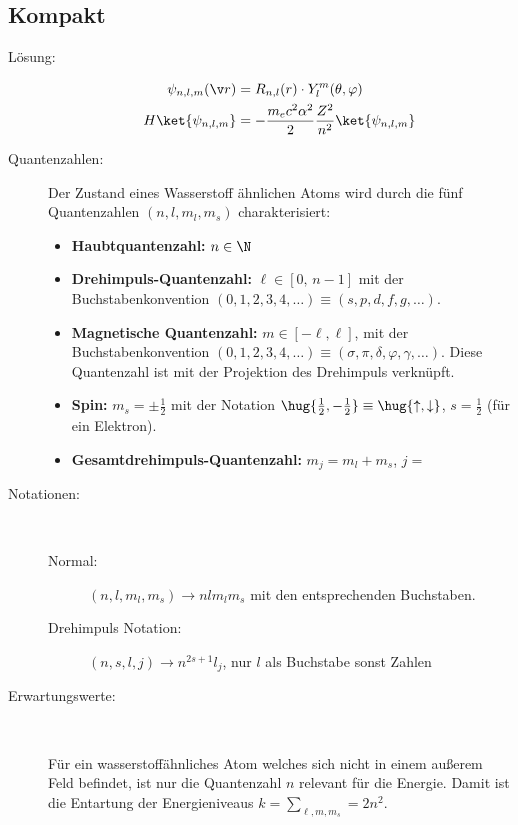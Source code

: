 \documentclass[twocolumn]{summery_4.1}
\begin{document}
\subsection{Kompakt} 
\begin{description}
    \item[Lösung:]
    \begin{align*}
        \psi_{n,l,m}(\v r) &= R_{n,l}(r)\cdot Y_l^m(\theta,\varphi)\\
        H \ket {\psi_{n,l,m}} &= -\frac{m_e c^2 \alpha^2}{2}\frac{Z^2}{n^2}\ket{\psi_{n,l,m}}
    \end{align*}
    \item[Quantenzahlen:]
    Der Zustand eines Wasserstoff ähnlichen Atoms wird durch die fünf Quantenzahlen $(n,l,m_l,m_s)$ charakterisiert:
    \begin{itemize}
        \item {\bf Haubtquantenzahl:} \(
            n\in\N\)
        \item {\bf Drehimpuls-Quantenzahl:} \(\ell\in[0,\,n-1]\)
        mit der Buchstabenkonvention \((0,1,2,3,4,\dots)\equiv (s,p,d,f,g,\dots)\). 
        \item {\bf Magnetische Quantenzahl:} \(m\in[-\ell,\ell]\), mit der Buchstabenkonvention
        \((0,1,2,3,4,\dots)\equiv (\sigma, \pi, \delta, \varphi, \gamma,\dots )\).
        Diese Quantenzahl ist mit der Projektion des Drehimpuls verknüpft.
        \item {\bf Spin:} \(m_s = \pm \frac12\) mit der Notation \(\hug{\frac12, -\frac12}\equiv \hug{\uparrow, \downarrow}\), \(s = \frac12\) (für ein Elektron). 
        \item {\bf Gesamtdrehimpuls-Quantenzahl:} \(m_j = m_l + m_s\), \(j=\)
    \end{itemize} 

    \item[Notationen:]\,
    
        \begin{description}
            \item[{\normalfont Normal:}] \((n,l,m_l,m_s) \to nlm_lm_s\) mit den entsprechenden Buchstaben.
            \item[{\normalfont  Drehimpuls Notation:}] \((n,s,l,j)\to n^{2s+1}l_j\), nur \(l\) als Buchstabe sonst Zahlen
        \end{description}

    \item[Erwartungswerte:]\,
    
    Für ein wasserstoffähnliches Atom welches sich nicht in einem außerem Feld befindet, ist nur die Quantenzahl \(n\) relevant für die Energie. Damit ist die Entartung der Energieniveaus \(k= \sum_{\ell,m,m_s} =2n^2 \).  


\end{description}
\end{document}
